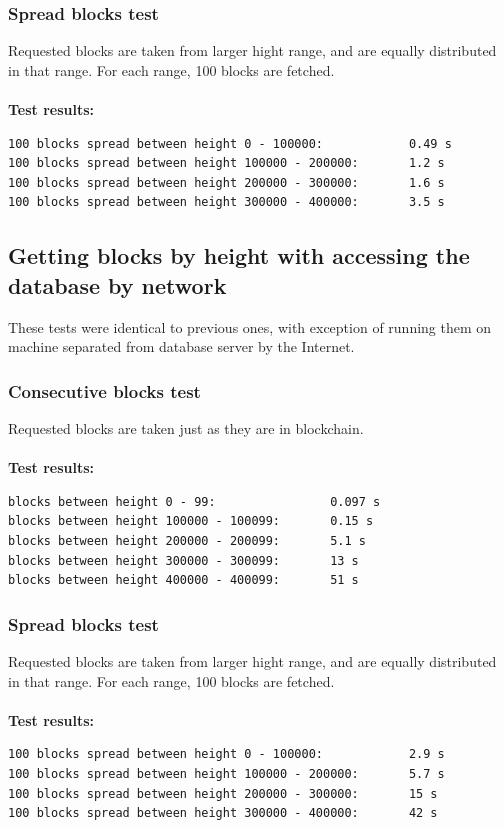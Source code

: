 \documentclass[12pt, en, eng, oneside, final]{mgr}
\begin{document}
\subsubsection{Spread blocks test}
Requested blocks are taken from larger hight range, and are equally distributed in that range. For each range, 100 blocks are fetched.
\\
\\ 
\textbf{Test results:}
\begin{verbatim}
100 blocks spread between height 0 - 100000:            0.49 s
100 blocks spread between height 100000 - 200000:       1.2 s
100 blocks spread between height 200000 - 300000:       1.6 s
100 blocks spread between height 300000 - 400000:       3.5 s
\end{verbatim}


\subsection{Getting blocks by height with accessing the database by network}
These tests were identical to previous ones, with exception of running them on machine separated from database server by the Internet.

\subsubsection{Consecutive blocks test}
Requested blocks are taken just as they are in blockchain.
\\
\\
\textbf{Test results:}
\begin{verbatim}
blocks between height 0 - 99:                0.097 s
blocks between height 100000 - 100099:       0.15 s
blocks between height 200000 - 200099:       5.1 s
blocks between height 300000 - 300099:       13 s
blocks between height 400000 - 400099:       51 s
\end{verbatim}

\subsubsection{Spread blocks test}
Requested blocks are taken from larger hight range, and are equally distributed in that range. For each range, 100 blocks are fetched.
\\
\\ 
\textbf{Test results:}
\begin{verbatim}
100 blocks spread between height 0 - 100000:            2.9 s
100 blocks spread between height 100000 - 200000:       5.7 s
100 blocks spread between height 200000 - 300000:       15 s
100 blocks spread between height 300000 - 400000:       42 s
\end{verbatim}
\end{document}
